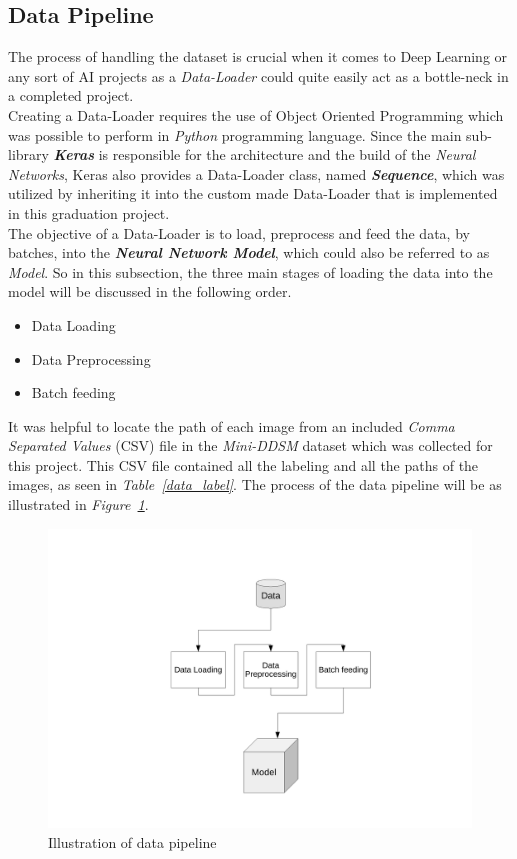 \documentclass[12pt]{extarticle}
\begin{document}
	\subsection{Data Pipeline}
	The process of handling the dataset is crucial when it comes to Deep Learning or any sort of AI projects as a \emph{Data-Loader} could quite easily act as a bottle-neck in a completed project.\\
	Creating a Data-Loader requires the use of Object Oriented Programming which was possible to perform in \emph{Python} programming language. Since the main sub-library \textbf{\textit{Keras}} is responsible for the architecture and the build of the \emph{Neural Networks}, Keras also provides a Data-Loader class, named \textbf{\textit{Sequence}}, which was utilized by inheriting it into the custom made Data-Loader that is implemented in this graduation project.\\
	The objective of a Data-Loader is to load, preprocess and feed the data, by batches, into the \textbf{\textit{Neural Network Model}}, which could also be referred to as \emph{Model}. So in this subsection, the three main stages of loading the data into the model will be discussed in the following order.
	\begin{itemize}
		\item Data Loading
		\item Data Preprocessing
		\item Batch feeding
	\end{itemize}
	
	It was helpful to locate the path of each image from an included \emph{Comma Separated Values} (CSV) file in the \emph{Mini-DDSM} dataset which was collected for this project. This CSV file contained all the labeling and all the paths of the images, as seen in \emph{Table~\ref{data_label}}. The process of the data pipeline will be as illustrated in \emph{Figure~\ref{fig:pipeline}}.
	\begin{figure}[h]
		\centering
		\includegraphics[width=1\textwidth]{pics/Figures/Data_pipeline.pdf}
		\caption{\small{Illustration of data pipeline}}
		\label{fig:pipeline}
	\end{figure}
	
\end{document}
